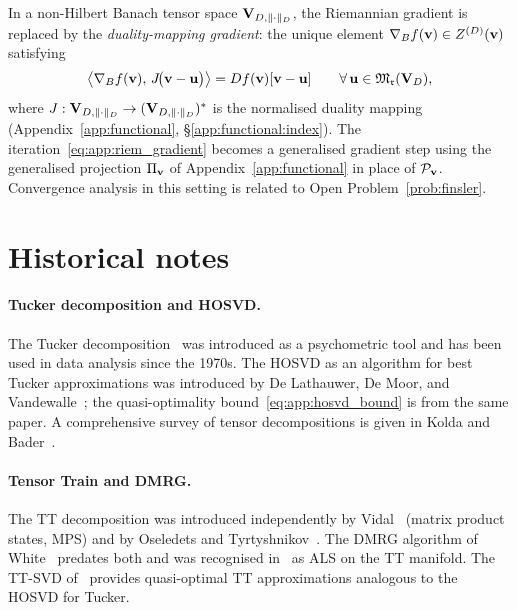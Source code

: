 In a non-Hilbert Banach tensor space $\mathbf{V}_{D,\|\cdot\|_D}$, the Riemannian gradient
is replaced by the \emph{duality-mapping gradient}: the unique element
$\nabla_B f(\mathbf{v}) \in Z^{(D)}(\mathbf{v})$ satisfying
\begin{equation}
\label{eq:app:banach_gradient}
    \bigl\langle \nabla_B f(\mathbf{v}),\,
    J\!\bigl(\mathbf{v} - \mathbf{u}\bigr)\bigr\rangle
    = Df(\mathbf{v})[\mathbf{v} - \mathbf{u}]
    \qquad \forall\,\mathbf{u} \in \mathfrak{M}_{\mathfrak{r}}(\mathbf{V}_D),
\end{equation}
where $J: \mathbf{V}_{D,\|\cdot\|_D} \to (\mathbf{V}_{D,\|\cdot\|_D})^*$ is the normalised duality mapping
(Appendix~\ref{app:functional}, \S\ref{app:functional:index}).
The iteration~\eqref{eq:app:riem_gradient} becomes a generalised
gradient step using the generalised projection $\Pi_{\mathbf{v}}$ of
Appendix~\ref{app:functional} in place of $\mathcal{P}_{\mathbf{v}}$. Convergence
analysis in this setting is related to Open Problem~\ref{prob:finsler}.

\section{Historical notes}
\label{app:alg:history}

\paragraph{Tucker decomposition and HOSVD.}
The Tucker decomposition~\cite{Tucker1966} was introduced as a
psychometric tool and has been used in data analysis since the 1970s.
The HOSVD as an algorithm for best Tucker approximations was introduced
by De Lathauwer, De Moor, and Vandewalle~\cite{DeLathauwer2000}; the
quasi-optimality bound~\eqref{eq:app:hosvd_bound} is from the same
paper. A comprehensive survey of tensor decompositions is given in
Kolda and Bader~\cite{KoldaBader2009}.

\paragraph{Tensor Train and DMRG.}
The TT decomposition was introduced independently by Vidal~\cite{Vidal2003}
(matrix product states, MPS) and by Oseledets and
Tyrtyshnikov~\cite{Oseledets2011}. The DMRG algorithm of
White~\cite{White1992} predates both and was recognised
in~\cite{HoltzRohwedderSchneider2012} as ALS on the TT manifold.
The TT-SVD of~\cite{Oseledets2011} provides quasi-optimal TT
approximations analogous to the HOSVD for Tucker.


